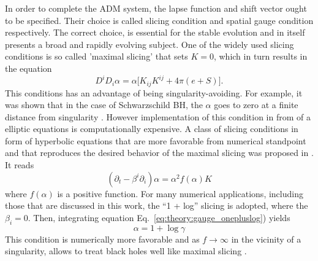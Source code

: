 In order to complete the \ac{ADM} system, the lapse function and shift vector ought to be 
specified. Their choice is called slicing condition and spatial gauge condition respectively.
The correct choice, is essential for the stable evolution and in itself presents a 
broad and rapidly evolving subject.
%
One of the widely used slicing conditions is so called 
'maximal slicing' that sets $K=0$, which in turn results in the equation
%
\begin{equation}
    D^{i}D_{i}\alpha = \alpha\big[K_{ij}K^{ij} + 4\pi(e + S)\big].
\end{equation}
%
%
This conditions has an advantage of being singularity-avoiding. For example, it was 
shown that in the case of Schwarzschild \ac{BH}, the $\alpha$ goes to zero at a finite 
distance from singularity \citep{Geyer:1995}. 
However implementation of this condition in from of a elliptic equations is 
computationally expensive.
%
A class of slicing conditions in form of hyperbolic equations that are more 
favorable from numerical standpoint and that reproduces the desired behavior of the maximal 
slicing was proposed in \citet{Bona:1994dr}. 
%
It reads 
%
\begin{equation}
(\partial_t - \beta^i\partial_i)\alpha = \alpha^2 f(\alpha)K
\label{eq:theory:gauge_onepluslog}
\end{equation}
%
%
%
where $f(\alpha)$ is a positive function.
%
For many numerical applications, including those that are discussed in this work, 
the ``1 + log'' slicing is adopted, where the $\beta_i=0$. 
Then, integrating equation Eq.~\eqref{eq:theory:gauge_onepluslog}) yields 
%
\begin{equation}
    \alpha = 1 + \log\gamma
\end{equation}
%
This condition is numerically more favorable and as $f\rightarrow\infty$ in the vicinity of a singularity, 
allows to treat black holes well like maximal slicing \citep{Baumgarte:2002jm}.


